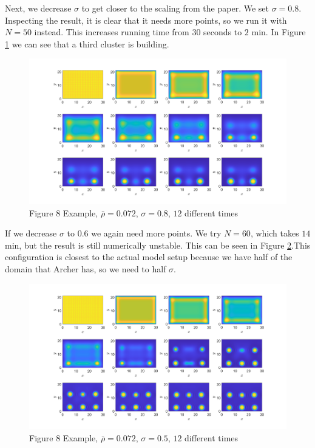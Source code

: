 \documentclass[11pt, a4paper]{article}
\theoremstyle{definition}
\begin{document}
	Next, we decrease $\sigma$ to get closer to the scaling from the paper. We set $\sigma = 0.8$. Inspecting the result, it is clear that it needs more points, so we run it with $N = 50$ instead. This increases running time from $30$ seconds to $2$ min. In Figure \ref{F2} we can see that a third cluster is building. 
	\begin{figure}[h]
		\centering
		\includegraphics[scale=0.25]{Ex8F2.png}
		\caption{Figure 8 Example, $\bar \rho = 0.072$, $\sigma = 0.8$, $12$ different times} 
		\label{F2}
	\end{figure} 
	 If we decrease $\sigma$ to $0.6$ we again need more points. We try $N = 60$, which takes $14$ min, but the result is still numerically unstable. This can be seen in Figure \ref{F3}.This configuration is closest to the actual model setup because we have half of the domain that Archer has, so we need to half $\sigma$.
	\begin{figure}[h]
		\centering
		\includegraphics[scale=0.25]{Ex8F3.png}
		\caption{Figure 8 Example, $\bar \rho = 0.072$, $\sigma = 0.5$, $12$ different times} 
		\label{F3}
	\end{figure} 
	
\end{document}
